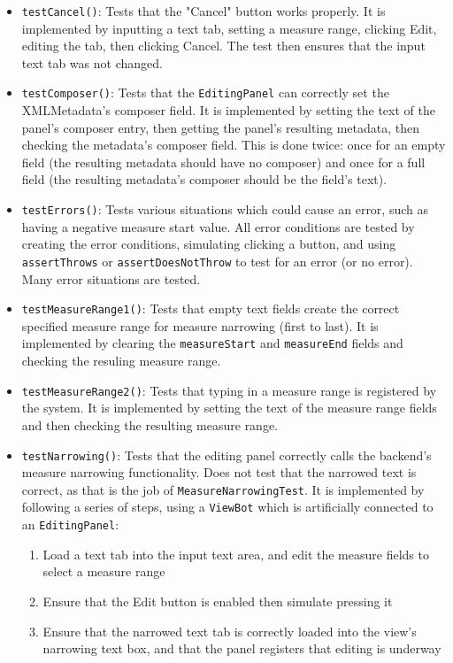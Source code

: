 \documentclass[11pt]{article}
\begin{document}
\begin{itemize}
\item \texttt{testCancel()}: Tests that the "Cancel" button works properly.  It is implemented by inputting a text tab, setting a measure range, clicking Edit, editing the tab, then clicking Cancel.  The test then ensures that the input text tab was not changed.
\item \texttt{testComposer()}: Tests that the \texttt{EditingPanel} can correctly set the XMLMetadata's composer field.  It is implemented by setting the text of the panel's composer entry, then getting the panel's resulting metadata, then checking the metadata's composer field.  This is done twice: once for an empty field (the resulting metadata should have no composer) and once for a full field (the resulting metadata's composer should be the field's text).
\item \texttt{testErrors()}: Tests various situations which could cause an error, such as having a negative measure start value.  All error conditions are tested by creating the error conditions, simulating clicking a button, and using \texttt{assertThrows} or \texttt{assertDoesNotThrow} to test for an error (or no error).  Many error situations are tested.
\item \texttt{testMeasureRange1()}: Tests that empty text fields create the correct specified measure range for measure narrowing (first to last).  It is implemented by clearing the \texttt{measureStart} and \texttt{measureEnd} fields and checking the resuling measure range.
\item \texttt{testMeasureRange2()}: Tests that typing in a measure range is registered by the system.  It is implemented by setting the text of the measure range fields and then checking the resulting measure range.
\item \texttt{testNarrowing()}: Tests that the editing panel correctly calls the backend's measure narrowing functionality.  Does not test that the narrowed text is correct, as that is the job of \texttt{MeasureNarrowingTest}.  It is implemented by following a series of steps, using a \texttt{ViewBot} which is artificially connected to an \texttt{EditingPanel}:
\begin{enumerate}
\item Load a text tab into the input text area, and edit the measure fields to select a measure range
\item Ensure that the Edit button is enabled then simulate pressing it
\item Ensure that the narrowed text tab is correctly loaded into the view's narrowing text box, and that the panel registers that editing is underway

\end{enumerate}
\end{itemize}
\end{document}
